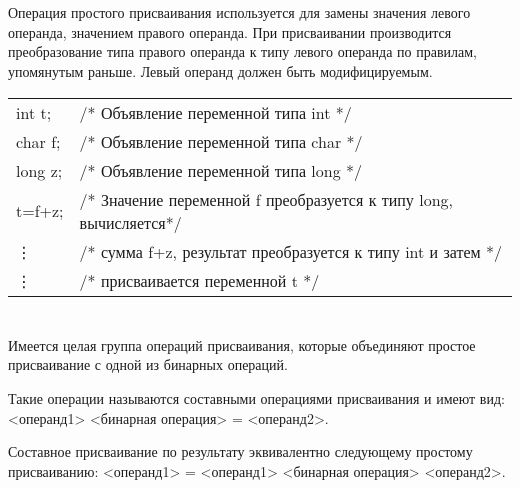 \section{}

Операция простого присваивания используется для замены значения левого операнда, значением правого операнда. При присваивании производится преобразование типа правого операнда к типу левого операнда по правилам, упомянутым раньше. Левый операнд должен быть модифицируемым. \killoverfullbefore \BL 

\begin{pExample}
\begin{tabular}{ l l }
int t; & \textcolor{exComm}{/* Объявление переменной типа int */} \\
char f; & \textcolor{exComm}{/* Объявление переменной типа char */} \\
long z; & \textcolor{exComm}{/* Объявление переменной типа long */} \\
t=f+z;  & \textcolor{exComm}{/* Значение переменной f преобразуется к типу long, вычисляется*/} \\
\vdots & \textcolor{exComm}{/* сумма f+z, результат преобразуется к типу int и затем */} \\
\vdots & \textcolor{exComm}{/*  присваивается переменной t */} \\
\end{tabular}
\end{pExample}

\section{}

Имеется целая группа операций присваивания, которые объединяют простое присваивание с одной из бинарных операций. \killoverfullbefore

Такие операции называются составными операциями присваивания и имеют вид: <операнд1> <бинарная операция> = <операнд2>. \killoverfullbefore

Составное присваивание по результату эквивалентно следующему простому присваиванию: <операнд1> = <операнд1> <бинарная операция> <операнд2>. \killoverfullbefore

